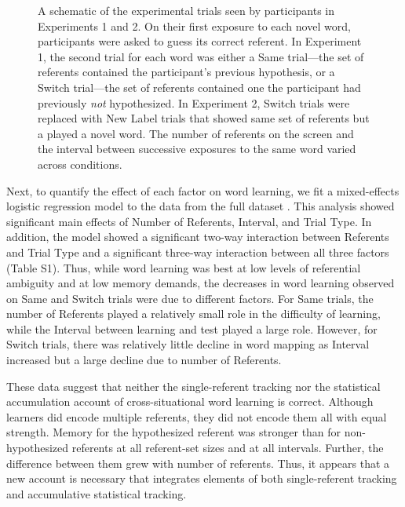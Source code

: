 \documentclass{pnastwo}
\begin{document}
\begin{article}
\begin{figure}
	\caption{\label{fig:design} A schematic of the experimental trials seen by participants in Experiments 1 and 2. On their first exposure to each novel word, participants were asked to guess its correct referent. In Experiment 1, the second trial for each word was either a Same trial---the set of referents contained the participant's previous hypothesis, or a Switch trial---the set of referents contained one the participant had previously \emph{not} hypothesized. In Experiment 2, Switch trials were replaced with New Label trials that showed same set of referents but a played a novel word. The number of referents on the screen and the interval between successive exposures to the same word varied across conditions.}
\end{figure}

Next, to quantify the effect of each factor on word learning, we fit a mixed-effects logistic regression model to the data from the full dataset \citep{Baayen2008}. This analysis showed significant main effects of Number of Referents, Interval, and Trial Type. In addition, the model showed a significant two-way interaction between Referents and Trial Type and a significant three-way interaction between all three factors (Table S1). Thus, while word learning was best at low levels of referential ambiguity and at low memory demands, the decreases in word learning observed on Same and Switch trials were due to different factors. For Same trials, the number of Referents played a relatively small role in the difficulty of learning, while the Interval between learning and test played a large role. However, for Switch trials, there was relatively little decline in word mapping as Interval increased but a large decline due to number of Referents. 

These data suggest that neither the single-referent tracking nor the statistical accumulation account of cross-situational word learning is correct. Although learners did encode multiple referents, they did not encode them all with equal strength. Memory for the hypothesized referent was stronger than for non-hypothesized referents at all referent-set sizes and at all intervals. Further, the difference between them grew with number of referents. Thus, it appears that a new account is necessary that integrates elements of both single-referent tracking and accumulative statistical tracking.


\end{article}
\end{document}
